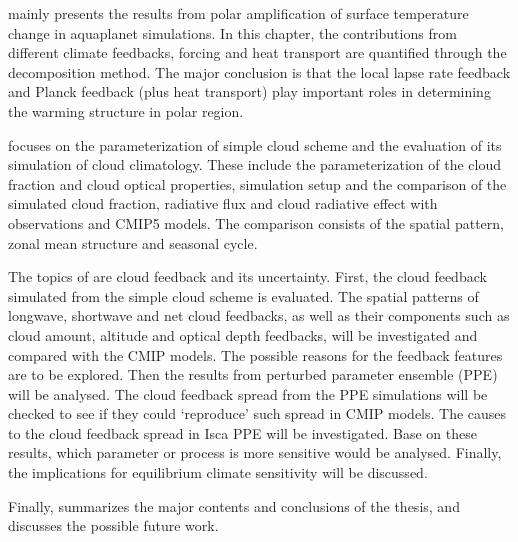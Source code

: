  mainly presents the results from polar amplification of surface temperature change in aquaplanet simulations. In this chapter, the contributions from different climate feedbacks, forcing and heat transport are quantified through the decomposition method. The major conclusion is that the local lapse rate feedback and Planck feedback (plus heat transport) play important roles in determining the warming structure in polar region.

 focuses on the parameterization of simple cloud scheme and the evaluation of its simulation of cloud climatology. These include the parameterization of the cloud fraction and cloud optical properties, simulation setup and the comparison of the simulated cloud fraction, radiative flux and cloud radiative effect with observations and CMIP5 models. The comparison consists of the spatial pattern, zonal mean structure and seasonal cycle. %

The topics of  are cloud feedback and its uncertainty. First, the cloud feedback simulated from the simple cloud scheme is evaluated. The spatial patterns of longwave, shortwave and net cloud feedbacks, as well as their components such as cloud amount, altitude and optical depth feedbacks, will be investigated and compared with the CMIP models. The possible reasons for the feedback features are to be explored. Then the results from perturbed parameter ensemble (PPE) will be analysed. The cloud feedback spread from the PPE simulations will be checked to see if they could `reproduce' such spread in CMIP models. The causes to the cloud feedback spread in Isca PPE will be investigated. Base on these results, which parameter or process is more sensitive would be analysed. Finally, the implications for equilibrium climate sensitivity will be discussed.

Finally,  summarizes the major contents and conclusions of the thesis, and discusses the possible future work.

